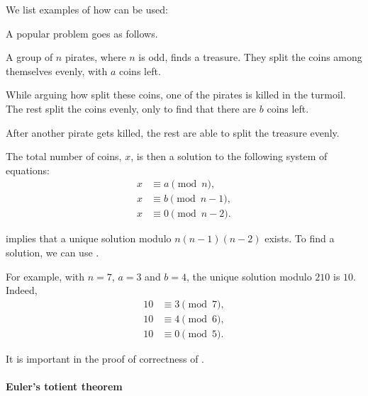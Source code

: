 \begin{example}\label{ex:thm:modular_chinese_remainder_theorem}
  We list examples of how  can be used:
  \begin{thmenum}
     A popular problem goes as follows.

    A group of \( n \) pirates, where \( n \) is odd, finds a treasure. They split the coins among themselves evenly, with \( a \) coins left.

    While arguing how split these coins, one of the pirates is killed in the turmoil. The rest split the coins evenly, only to find that there are \( b \) coins left.

    After another pirate gets killed, the rest are able to split the treasure evenly.

    The total number of coins, \( x \), is then a solution to the following system of equations:
    \begin{align*}
      x &\equiv a \pmod n, \\
      x &\equiv b \pmod {n - 1}, \\
      x &\equiv 0 \pmod {n - 2}.
    \end{align*}

     implies that a unique solution modulo \( n(n-1)(n-2) \) exists. To find a solution, we can use .

    For example, with \( n = 7 \), \( a = 3 \) and \( b = 4 \), the unique solution modulo \( 210 \) is \( 10 \). Indeed,
    \begin{align*}
      10 &\equiv 3 \pmod 7, \\
      10 &\equiv 4 \pmod 6, \\
      10 &\equiv 0 \pmod 5.
    \end{align*}

     It is important in the proof of correctness of .
  \end{thmenum}
\end{example}

\paragraph{Euler's totient theorem}

